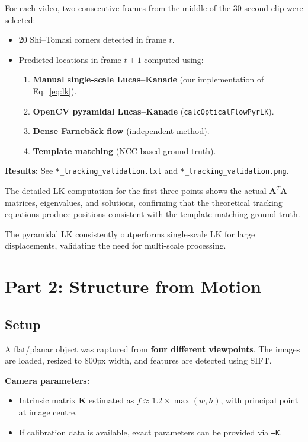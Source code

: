 \documentclass[12pt, a4paper]{article}
\begin{document}
For each video, two consecutive frames from the middle of the 30-second clip were selected:
\begin{itemize}
  \item 20 Shi--Tomasi corners detected in frame $t$.
  \item Predicted locations in frame $t+1$ computed using:
  \begin{enumerate}
    \item \textbf{Manual single-scale Lucas--Kanade} (our implementation of Eq.~\ref{eq:lk}).
    \item \textbf{OpenCV pyramidal Lucas--Kanade} (\texttt{calcOpticalFlowPyrLK}).
    \item \textbf{Dense Farneb\"ack flow} (independent method).
    \item \textbf{Template matching} (NCC-based ground truth).
  \end{enumerate}
\end{itemize}

\textbf{Results:}  See \texttt{*\_tracking\_validation.txt} and \texttt{*\_tracking\_validation.png}.

The detailed LK computation for the first three points shows the actual $\mathbf{A}^T\mathbf{A}$ matrices, eigenvalues, and solutions, confirming that the theoretical tracking equations produce positions consistent with the template-matching ground truth.

The pyramidal LK consistently outperforms single-scale LK for large displacements, validating the need for multi-scale processing.


\newpage
\section{Part 2: Structure from Motion}

\subsection{Setup}

A flat/planar object was captured from \textbf{four different viewpoints}.  The images are loaded, resized to 800px width, and features are detected using SIFT.

\textbf{Camera parameters:}
\begin{itemize}
  \item Intrinsic matrix $\mathbf{K}$ estimated as $f \approx 1.2 \times \max(w,h)$, with principal point at image centre.
  \item If calibration data is available, exact parameters can be provided via \texttt{--K}.
\end{itemize}
\end{document}

